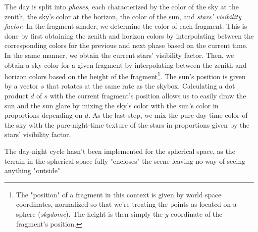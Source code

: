 The day is split into \textit{phases}, each characterized by the color of the sky at the zenith, the sky's color at the horizon, the color of the sun, and \textit{stars' visibility factor}.
In the fragment shader, we determine the color of each fragment.
This is done by first obtaining the zenith and horizon colors by interpolating between the corresponding colors for the previous and next phase based on the current time.
In the same manner, we obtain the current stars' visibility factor.
Then, we obtain a sky color for a given fragment by interpolating between the zenith and horizon colors based on the height of the fragment\footnote{The "position" of a fragment in this context is given by world space coordinates, normalized so that we're treating the points as located on a sphere (\textit{skydome}). The height is then simply the $y$ coordinate of the fragment's position.}.
The sun's position is given by a vector $s$ that rotates at the same rate as the skybox.
Calculating a dot product $d$ of $s$ with the current fragment's position allows us to easily draw the sun and the sun glare by mixing the sky's color with the sun's color in proportions depending on $d$.
As the last step, we mix the pure-day-time color of the sky with the pure-night-time texture of the stars in proportions given by the stars' visibility factor.

The day-night cycle hasn't been implemented for the spherical space, as the terrain in the spherical space fully "encloses" the scene leaving no way of seeing anything "outside".